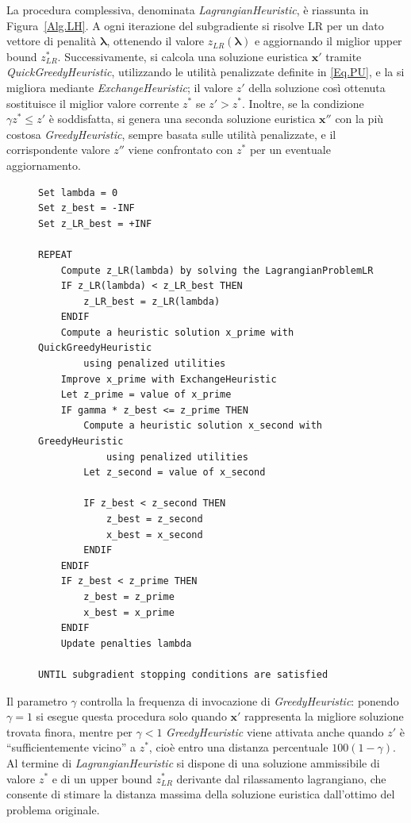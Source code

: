 \documentclass[12pt,a4paper,openright,twoside]{book}
\begin{document}
La procedura complessiva, denominata {\em LagrangianHeuristic}, è riassunta in Figura~\ref{Alg.LH}. A ogni iterazione del subgradiente si risolve LR per un dato vettore di penalità $\boldsymbol{\lambda}$, ottenendo il valore $z_{LR}(\boldsymbol{\lambda})$ e aggiornando il miglior upper bound $z^*_{LR}$. Successivamente, si calcola una soluzione euristica $\boldsymbol{x}'$ tramite {\em QuickGreedyHeuristic}, utilizzando le utilità penalizzate definite in \eqref{Eq.PU}, e la si migliora mediante {\em ExchangeHeuristic}; il valore $z'$ della soluzione così ottenuta sostituisce il miglior valore corrente $z^*$ se $z' > z^*$. Inoltre, se la condizione $\gamma z^* \leq z'$ è soddisfatta, si genera una seconda soluzione euristica $\boldsymbol{x}''$ con la più costosa {\em GreedyHeuristic}, sempre basata sulle utilità penalizzate, e il corrispondente valore $z''$ viene confrontato con $z^*$ per un eventuale aggiornamento.

\begin{figure}[H]
\begin{lstlisting}[style=pseudo, caption={Algorithm LagrangianHeuristic}, label={Alg.LH}]
Set lambda = 0
Set z_best = -INF
Set z_LR_best = +INF

REPEAT
    Compute z_LR(lambda) by solving the LagrangianProblemLR
    IF z_LR(lambda) < z_LR_best THEN
        z_LR_best = z_LR(lambda)
    ENDIF
    Compute a heuristic solution x_prime with QuickGreedyHeuristic
        using penalized utilities
    Improve x_prime with ExchangeHeuristic
    Let z_prime = value of x_prime
    IF gamma * z_best <= z_prime THEN
        Compute a heuristic solution x_second with GreedyHeuristic
            using penalized utilities
        Let z_second = value of x_second

        IF z_best < z_second THEN
            z_best = z_second
            x_best = x_second
        ENDIF
    ENDIF
    IF z_best < z_prime THEN
        z_best = z_prime
        x_best = x_prime
    ENDIF
    Update penalties lambda

UNTIL subgradient stopping conditions are satisfied
\end{lstlisting}
\end{figure}



Il parametro $\gamma$ controlla la frequenza di invocazione di {\em GreedyHeuristic}: ponendo $\gamma=1$ si esegue questa procedura solo quando $\boldsymbol{x}'$ rappresenta la migliore soluzione trovata finora, mentre per $\gamma<1$ {\em GreedyHeuristic} viene attivata anche quando $z'$ è ``sufficientemente vicino'' a $z^*$, cioè entro una distanza percentuale $100(1-\gamma)$. Al termine di {\em LagrangianHeuristic} si dispone di una soluzione ammissibile di valore $z^*$ e di un upper bound $z^*_{LR}$ derivante dal rilassamento lagrangiano, che consente di stimare la distanza massima della soluzione euristica dall’ottimo del problema originale.
\end{document}
